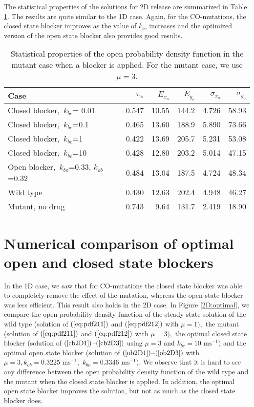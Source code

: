 {The statistical properties of the solutions for 2D release are summarized in Table \ref{tab:drg_tab_2D}. The results are quite similar to the 1D case. Again, for the CO-mutations, the closed state blocker improves as the value of $k_{bc}$ increases and the optimized version of the open state blocker also provides good results.

\begin{table}  \begin{center}
\begin{tabular}
[c]{|l|r|r|r|r|r|}\hline
Case & $\pi_o$ & $E_{x_o}$ &
 $E_{y_o}$ & $\sigma_{x_o}$ & $\sigma_{y_o}$ \\[1mm]\hline\hline
Closed blocker,\ $k_{bc}$= 0.01 & 0.547 & 10.55 & 144.2 &4.726 &  58.93\\\hline
Closed blocker,\ $k_{bc}$=0.1 & 0.465 & 13.60 & 188.9 & 5.890 &  73.66  \\\hline
Closed blocker,\ $k_{bc}$=1 & 0.422 & 13.69 & 205.7 &   5.231 &   53.08 \\\hline
Closed blocker,\ $k_{bc}$=10 & 0.428 & 12.80 & 203.2 &  5.014 &  47.15  \\\hline
Open blocker,\ $k_{bo}$=0.33, $k_{ob}$=0.32 & 0.484 & 13.04 & 187.5 &  4.724 &  48.34 \\\hline  \hline
Wild type & 0.430 & 12.63 & 202.4 &4.948  & 46.27  \\\hline
Mutant, no drug & 0.743 & 9.64 & 131.7 & 2.419 &  18.90  \\ \hline
\end{tabular}
 \end{center}
\caption{Statistical properties of the open probability density function in the mutant case when a blocker is applied.  For the mutant case, we use $\mu=3$.
\label{tab:drg_tab_2D}}
\end{table}


\section[Numerical comparison of blockers]{Numerical comparison of optimal open and closed state blockers}

In the 1D case, we saw that for CO-mutations the closed state blocker was able 
to completely remove the effect of the mutation, whereas the open state blocker 
was less efficient.
This result also holds in the 2D case. In Figure \ref{2D:optimal}, we compare the open
probability density function of the steady state solution of the wild type
(solution of $(\ref{eq:pdf211})$ and $(\ref{eq:pdf212})$ with $\mu=1),$ the mutant
(solution of $(\ref{eq:pdf211})$ and $(\ref{eq:pdf212})$ with $\mu=3),$ the optimal closed state blocker
(solution of $(\ref{cb2D1})$--$(\ref{cb2D3})$ using $\mu=3$ and $k_{bc}=10\text{ ms}^{-1})$ and the optimal
open state blocker (solution of $(\ref{ob2D1})$--$(\ref{ob2D3})$ with $\mu=3,k_{ob}=0.3225\text{ ms}^{-1},$
$k_{bo}=0.3346\text{ ms}^{-1}).$ We observe that it is hard to see any difference between the open probability
density function of the wild type and the mutant when the closed state blocker is applied. In addition,
the optimal open state blocker improves the solution, but not as much as the closed state blocker does.

}
